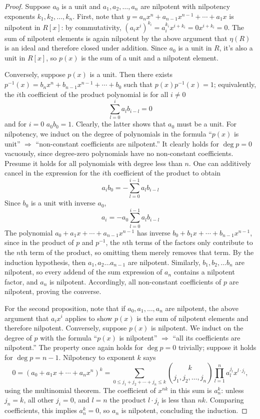 \documentclass{article}
\begin{document}
\begin{proof}
  Suppose $a_{0}$ is a unit and $a_{1}, a_{2}, \ldots, a_{n}$ are nilpotent with nilpotency exponents $k_{1}, k_{2}, \ldots, k_{n}$.
  First, note that $y = a_{n}x^{n} + a_{n-1}x^{n-1} + \cdots + a_{1}x$ is nilpotent in $R[x]$: by commutativity,
  $(a_{i}x^{i})^{k_{i}} = a_{i}^{k_{i}}x^{i + k_{i}} = 0x^{i + k_{i}} = 0$.
  The sum of nilpotent elements is again nilpotent by the above argument that $\eta(R)$ is an ideal and therefore closed under addition.
  Since $a_{0}$ is a unit in $R$, it's also a unit in $R[x]$, so $p(x)$ is the sum of a unit and a nilpotent element.

  Conversely, suppose $p(x)$ is a unit.
  Then there exists $p^{-1}(x) = b_{n}x^{n} + b_{n-1}x^{n-1} + \cdots + b_{0}$ such that $p(x)p^{-1}(x) = 1$;
  equivalently, the $i$th coefficient of the product polynomial is for all $i \neq 0$
  \[
    \sum_{l=0}^{i}a_{l}b_{i - l} = 0
  \]
  and for $i = 0$ $a_{0}b_{0} = 1$.
  Clearly, the latter shows that $a_{0}$ must be a unit.
  For nilpotency, we induct on the degree of polynomials in the formula ``$p(x)$ is unit'' $\Rightarrow$ ``non-constant coefficients are nilpotent.''
  It clearly holds for $\deg p = 0$ vacuously, since degree-zero polynomials have no non-constant coefficients.
  Presume it holds for all polynomials with degree less than $n$.
  One can additively cancel in the expression for the $i$th coefficient of the product to obtain
  \[
    a_{i}b_{0} = - \sum_{l=0}^{i-1}a_{l}b_{i-l}
  \]
  Since $b_{0}$ is a unit with inverse $a_{0}$,
  \[
    a_{i} = -a_{0} \sum_{l=0}^{i-1}a_{l}b_{i-l}
  \]
  The polynomial $a_{0} + a_{1}x + \cdots + a_{n-1}x^{n-1}$ has inverse $b_{0} + b_{1}x + \cdots + b_{n-1}x^{n-1}$, since in the product of $p$ and $p^{-1}$,
  the $n$th terms of the factors only contribute to the $n$th term of the product, so omitting them merely removes that term.
  By the induction hypothesis, then $a_{1}, a_{2} \ldots a_{n-1}$ are nilpotent.
  Similarly, $b_{1}, b_{2}, \ldots b_{n}$ are nilpotent, so every addend of the sum expression of $a_n$ contains a nilpotent factor, and $a_n$ is nilpotent.
  Accordingly, all non-constant coefficients of $p$ are nilpotent, proving the converse.

  For the second proposition, note that if $a_{0}, a_{1}, \ldots, a_{n}$ are nilpotent,
  the above argument that $a_{i}x^{i}$ applies to show $p(x)$ is the sum of nilpotent elements and therefore nilpotent.
  Conversely, suppose $p(x)$ is nilpotent.
  We induct on the degree of $p$ with the formula ``$p(x)$ is nilpotent'' $\Rightarrow$ ``all its coefficients are nilpotent.''
  The property once again holds for $\deg p = 0$ trivially; suppose it holds for $\deg p = n - 1$.
  Nilpotency to exponent $k$ says
  \[
    0 = (a_{0} + a_{1}x + \cdots + a_{n}x^{n})^{k}
    = \sum_{0\leq j_{1} +  j_{2} + \cdots + j_{n} \leq k}\binom{k}{j_{1},j_{2},\ldots,j_{n}}\prod_{l=1}^{n}a_{l}^{j_{l}}x^{l\cdot j_{l}},
  \]
  using the multinomial theorem.
  The coefficient of $x^{nk}$ in this sum is $a_{n}^{k}$: unless $j_{n} = k$, all other $j_{i} = 0$, and $l = n$ the product $l\cdot j_{l}$ is less than $nk$.
  Comparing coefficients, this implies $a_{n}^{k} = 0$, so $a_{n}$ is nilpotent, concluding the induction.
\end{proof}
\end{document}
